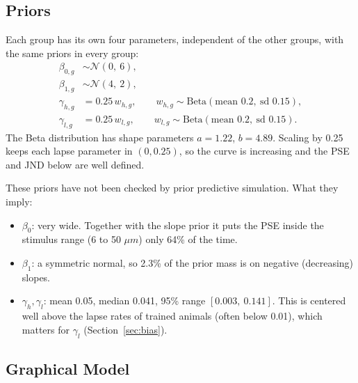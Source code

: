 \documentclass[11pt]{article}
\begin{document}
\subsection{Priors}

Each group has its own four parameters, independent of the other groups, with
the same priors in every group:
\begin{align*}
  \beta_{0,g} &\sim \mathcal{N}(0,\ 6), \\
  \beta_{1,g} &\sim \mathcal{N}(4,\ 2), \\
  \gamma_{h,g} &= 0.25\, w_{h,g}, \qquad w_{h,g} \sim \text{Beta}(\text{mean } 0.2,\ \text{sd } 0.15), \\
  \gamma_{l,g} &= 0.25\, w_{l,g}, \qquad w_{l,g} \sim \text{Beta}(\text{mean } 0.2,\ \text{sd } 0.15).
\end{align*}
The Beta distribution has shape parameters $a = 1.22$, $b = 4.89$. Scaling by 0.25
keeps each lapse parameter in $(0, 0.25)$, so the curve is increasing and the
PSE and JND below are well defined.

These priors have not been checked by prior predictive simulation. What they imply:
\begin{itemize}
  \item $\beta_0$: very wide. Together with the slope prior it puts the PSE inside
        the stimulus range (6 to 50 $\mu m$) only 64\% of the time.
  \item $\beta_1$: a symmetric normal, so 2.3\% of the prior mass is on negative
        (decreasing) slopes.
  \item $\gamma_h, \gamma_l$: mean 0.05, median 0.041, 95\% range
        $[0.003,\ 0.141]$. This is centered well above the lapse rates of trained
        animals (often below 0.01), which matters for $\gamma_l$
        (Section~\ref{sec:bias}).
\end{itemize}

\subsection{Graphical Model}
\end{document}
